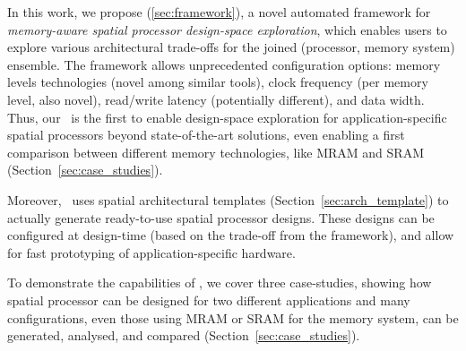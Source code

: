 In this work, we propose \frameworkname (\ref{sec:framework}), a novel automated framework for \textit{memory-aware spatial processor design-space exploration}, which enables users to explore various architectural trade-offs for the joined (processor, memory system) ensemble. The framework allows unprecedented configuration options: memory levels technologies (novel among similar tools), clock frequency (per memory level, also novel), read/write latency (potentially different), and data width. Thus, our \frameworkname~is the first to enable design-space exploration for application-specific spatial processors beyond state-of-the-art solutions, even enabling a first comparison between different memory technologies, like MRAM and SRAM (Section~\ref{sec:case_studies}).

Moreover, \frameworkname~uses spatial architectural templates (Section~\ref{sec:arch_template}) to actually generate ready-to-use spatial processor designs. These designs can be configured at design-time (based on the trade-off from the framework), and allow for fast prototyping of application-specific hardware.

To demonstrate the capabilities of \frameworkname, we cover three case-studies, showing how spatial processor can be designed for two different applications and many configurations, even those using MRAM or SRAM for the memory system, can be generated, analysed, and compared (Section~\ref{sec:case_studies}).




